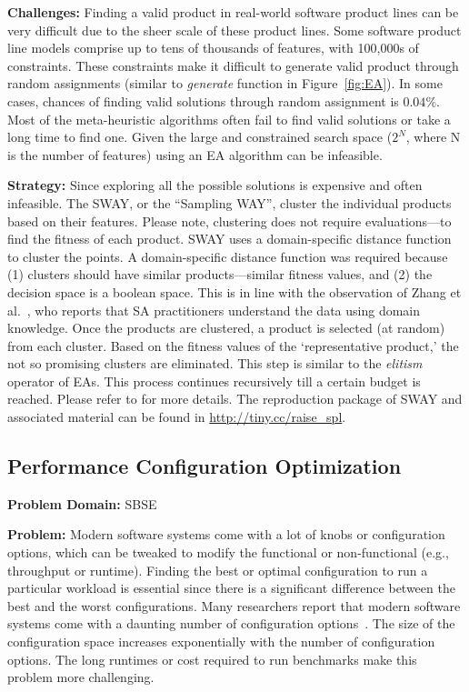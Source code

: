 \documentclass[table, xcdraw, sigconf,review, anonymous]{acmart}
\begin{document}
\noindent\textbf{Challenges: } Finding a valid product in real-world software product lines can be very difficult due to the sheer scale of these product lines. Some software product line models comprise up to tens of thousands
of features,  with 100,000s of constraints. These constraints make it difficult to generate valid product through random assignments (similar to \textit{generate} function in Figure~\ref{fig:EA}). In some cases, chances of finding valid solutions through random assignment is $0.04\%$. Most of the meta-heuristic algorithms often fail to find valid solutions or take a long time to find one. Given the large and constrained search space ($2^N$, where N is the number of features) using an EA algorithm can be infeasible.

\noindent\textbf{Strategy:} Since exploring all the possible solutions is expensive and often infeasible. The SWAY, or the ``Sampling WAY'', cluster the individual products based on their features. Please note, clustering does not require evaluations---to find the fitness of each product. SWAY uses a domain-specific distance function to cluster the points. A domain-specific distance function was required because (1) clusters should have similar products---similar fitness values, and (2) the decision space is a boolean space. This is in line with the observation of Zhang et al.~\cite{zhang2013software}, who reports that SA practitioners understand the data using domain knowledge. Once the products are clustered, a product is selected (at random) from each cluster. Based on the fitness values of the `representative product,' the not so promising clusters are eliminated. This step is similar to the \textit{elitism} operator of EAs. This process continues recursively till a certain budget is reached. Please refer to \cite{nair2016accidental, chen2017beyond, chen2017sampling} for more details. The reproduction package of SWAY and associated material can be found in \url{http://tiny.cc/raise_spl}.


\subsection{Performance Configuration Optimization}
\noindent\textbf{Problem Domain: } SBSE

\noindent\textbf{Problem: } Modern software systems come with a lot of knobs or configuration options, which can be tweaked to modify the functional or non-functional (e.g., throughput or runtime). Finding the best or optimal configuration to run a particular workload is essential since there is a significant difference between the best and the worst configurations. Many researchers report that modern software systems come with a daunting number of configuration options~\cite{xu2015hey}. The size of the configuration space increases exponentially with the number of configuration options. The long runtimes or cost required to run benchmarks make this problem more challenging.
\end{document}
